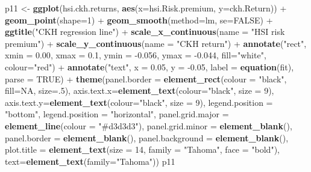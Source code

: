 \documentclass[]{article}
\newenvironment{Shaded}{\begin{snugshade}}{\end{snugshade}}
\newcommand{\KeywordTok}[1]{\textcolor[rgb]{0.13,0.29,0.53}{\textbf{{#1}}}}
\newcommand{\DataTypeTok}[1]{\textcolor[rgb]{0.13,0.29,0.53}{{#1}}}
\newcommand{\DecValTok}[1]{\textcolor[rgb]{0.00,0.00,0.81}{{#1}}}
\newcommand{\FloatTok}[1]{\textcolor[rgb]{0.00,0.00,0.81}{{#1}}}
\newcommand{\StringTok}[1]{\textcolor[rgb]{0.31,0.60,0.02}{{#1}}}
\newcommand{\OtherTok}[1]{\textcolor[rgb]{0.56,0.35,0.01}{{#1}}}
\newcommand{\NormalTok}[1]{{#1}}
\begin{document}
\begin{Shaded}
\begin{Highlighting}[]
\NormalTok{p11 <-}\StringTok{ }\KeywordTok{ggplot}\NormalTok{(hsi.ckh.returns, }\KeywordTok{aes}\NormalTok{(}\DataTypeTok{x=}\NormalTok{hsi.Risk.premium, }\DataTypeTok{y=}\NormalTok{ckh.Return)) +}\StringTok{ }\KeywordTok{geom_point}\NormalTok{(}\DataTypeTok{shape=}\DecValTok{1}\NormalTok{) +}\StringTok{ }\KeywordTok{geom_smooth}\NormalTok{(}\DataTypeTok{method=}\NormalTok{lm, }\DataTypeTok{se=}\OtherTok{FALSE}\NormalTok{) +}
\StringTok{  }\KeywordTok{ggtitle}\NormalTok{(}\StringTok{"CKH regression line"}\NormalTok{) +}
\StringTok{  }\KeywordTok{scale_x_continuous}\NormalTok{(}\DataTypeTok{name =} \StringTok{"HSI risk premium"}\NormalTok{) +}
\StringTok{  }\KeywordTok{scale_y_continuous}\NormalTok{(}\DataTypeTok{name =} \StringTok{"CKH return"}\NormalTok{) +}
\StringTok{  }\KeywordTok{annotate}\NormalTok{(}\StringTok{"rect"}\NormalTok{, }\DataTypeTok{xmin =} \FloatTok{0.00}\NormalTok{, }\DataTypeTok{xmax =} \FloatTok{0.1}\NormalTok{, }\DataTypeTok{ymin =} \NormalTok{-}\FloatTok{0.056}\NormalTok{, }\DataTypeTok{ymax =} \NormalTok{-}\FloatTok{0.044}\NormalTok{, }\DataTypeTok{fill=}\StringTok{"white"}\NormalTok{, }\DataTypeTok{colour=}\StringTok{"red"}\NormalTok{) +}\StringTok{ }
\StringTok{  }\KeywordTok{annotate}\NormalTok{(}\StringTok{"text"}\NormalTok{, }\DataTypeTok{x =} \FloatTok{0.05}\NormalTok{, }\DataTypeTok{y =} \NormalTok{-}\FloatTok{0.05}\NormalTok{, }\DataTypeTok{label =} \KeywordTok{equation}\NormalTok{(fit), }\DataTypeTok{parse =} \OtherTok{TRUE}\NormalTok{) +}\StringTok{ }
\StringTok{  }\KeywordTok{theme}\NormalTok{(}\DataTypeTok{panel.border =} \KeywordTok{element_rect}\NormalTok{(}\DataTypeTok{colour =} \StringTok{"black"}\NormalTok{, }\DataTypeTok{fill=}\OtherTok{NA}\NormalTok{, }\DataTypeTok{size=}\NormalTok{.}\DecValTok{5}\NormalTok{),}
    \DataTypeTok{axis.text.x=}\KeywordTok{element_text}\NormalTok{(}\DataTypeTok{colour=}\StringTok{"black"}\NormalTok{, }\DataTypeTok{size =} \DecValTok{9}\NormalTok{), }
    \DataTypeTok{axis.text.y=}\KeywordTok{element_text}\NormalTok{(}\DataTypeTok{colour=}\StringTok{"black"}\NormalTok{, }\DataTypeTok{size =} \DecValTok{9}\NormalTok{), }
    \DataTypeTok{legend.position =} \StringTok{"bottom"}\NormalTok{, }\DataTypeTok{legend.position =} \StringTok{"horizontal"}\NormalTok{,}
    \DataTypeTok{panel.grid.major =} \KeywordTok{element_line}\NormalTok{(}\DataTypeTok{colour =} \StringTok{"#d3d3d3"}\NormalTok{), }
    \DataTypeTok{panel.grid.minor =} \KeywordTok{element_blank}\NormalTok{(), }
    \DataTypeTok{panel.border =} \KeywordTok{element_blank}\NormalTok{(), }\DataTypeTok{panel.background =} \KeywordTok{element_blank}\NormalTok{(),}
    \DataTypeTok{plot.title =} \KeywordTok{element_text}\NormalTok{(}\DataTypeTok{size =} \DecValTok{14}\NormalTok{, }\DataTypeTok{family =} \StringTok{"Tahoma"}\NormalTok{, }\DataTypeTok{face =} \StringTok{"bold"}\NormalTok{),}
    \DataTypeTok{text=}\KeywordTok{element_text}\NormalTok{(}\DataTypeTok{family=}\StringTok{"Tahoma"}\NormalTok{))}
\NormalTok{p11}
\end{Highlighting}
\end{Shaded}
\end{document}
